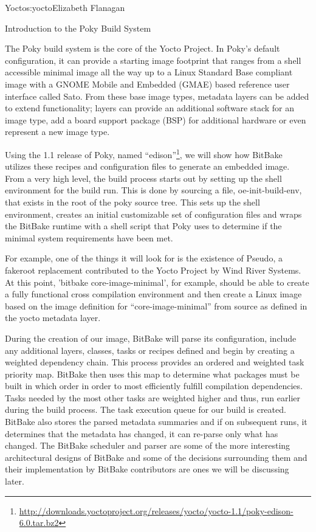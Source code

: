 \begin{aosachapter}{Yocto}{s:yocto}{Elizabeth Flanagan}
\begin{aosasect1}{Introduction to the Poky Build System}

The Poky build system is the core of the Yocto Project. In Poky's
default configuration, it can provide a starting image footprint that
ranges from a shell accessible minimal image all the way up to a Linux
Standard Base compliant image with a GNOME Mobile and Embedded (GMAE)
based reference user interface called Sato. From these base image
types, metadata layers can be added to extend functionality; layers
can provide an additional software stack for an image type, add a
board support package (BSP) for additional hardware or even represent
a new image type.

Using the 1.1 release of Poky, named
``edison''\footnote{\url{http://downloads.yoctoproject.org/releases/yocto/yocto-1.1/poky-edison-6.0.tar.bz2}},
we will show how BitBake utilizes these recipes and configuration
files to generate an embedded image. From a very high level, the build
process starts out by setting up the shell environment for the build
run. This is done by sourcing a file, oe-init-build-env, that exists
in the root of the poky source tree. This sets up the shell
environment, creates an initial customizable set of configuration
files and wraps the BitBake runtime with a shell script that Poky uses
to determine if the minimal system requirements have been met.

For example, one of the things it will look for is the existence of
Pseudo, a fakeroot replacement contributed to the Yocto Project by
Wind River Systems. At this point, 'bitbake core-image-minimal', for
example, should be able to create a fully functional cross compilation
environment and then create a Linux image based on the image
definition for ``core-image-minimal'' from source as defined
in the yocto metadata layer.

During the creation of our image, BitBake will parse its
configuration, include any additional layers, classes, tasks or
recipes defined and begin by creating a weighted dependency
chain. This process provides an ordered and weighted task priority
map. BitBake then uses this map to determine what packages must be
built in which order in order to most efficiently fulfill compilation
dependencies. Tasks needed by the most other tasks are weighted higher
and thus, run earlier during the build process. The task execution
queue for our build is created. BitBake also stores the parsed
metadata summaries and if on subsequent runs, it determines that the
metadata has changed, it can re-parse only what has changed. The
BitBake scheduler and parser are some of the more interesting
architectural designs of BitBake and some of the decisions surrounding
them and their implementation by BitBake contributors are ones we will
be discussing later.


\end{aosasect1}
\end{aosachapter}
